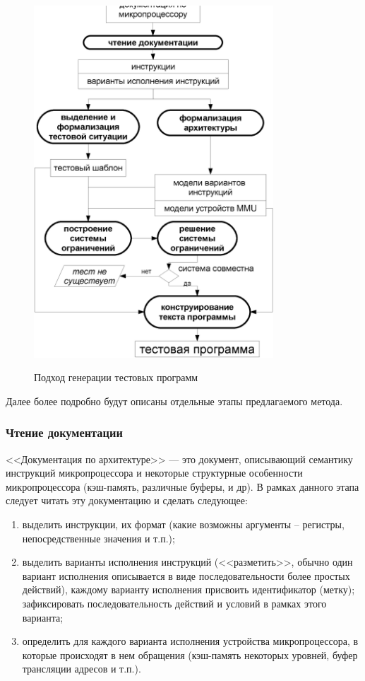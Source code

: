 \begin{figure}[p] \center
  \includegraphics[width=0.8\textwidth]{2.theor/process_manual}\\
  \caption{Подход генерации тестовых программ}\label{fig:process}
\end{figure}

Далее более подробно будут описаны отдельные этапы предлагаемого метода.

\subsubsection{Чтение документации}%

<<Документация по архитектуре>> --- это документ, описывающий семантику инструкций микропроцессора и некоторые структурные особенности микропроцессора (кэш-память, различные буферы, и др).
В рамках данного этапа следует читать эту документацию и сделать следующее:
\begin{enumerate}
  \item выделить инструкции, их формат (какие возможны аргументы -- регистры, непосредственные значения и т.п.);
  \item выделить варианты исполнения инструкций (<<разметить>>, обычно один вариант исполнения описывается в виде последовательности более простых действий), каждому варианту исполнения присвоить идентификатор (метку); зафиксировать последовательность действий и условий в рамках этого варианта;
  \item определить для каждого варианта исполнения устройства микропроцессора, в которые происходят в нем обращения (кэш-память некоторых уровней, буфер трансляции адресов и т.п.).
\end{enumerate}

